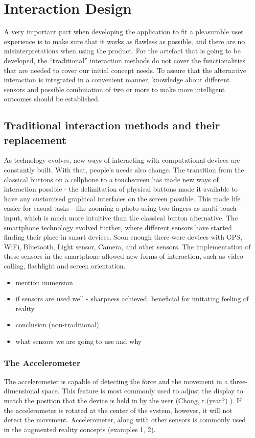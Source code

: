 \section{Interaction Design}
A very important part when developing the application to fit a pleasurable user experience is to make sure that it works as flawless as possible, and there are no misinterpretations when using the product. For the artefact that is going to be developed, the “traditional” interaction methods do not cover the functionalities that are needed to cover our initial concept needs. To assure that the alternative interaction is integrated in a convenient manner, knowledge about different sensors and possible combination of two or more to make more intelligent outcomes should be established.
\subsection{Traditional interaction methods and their replacement}
As technology evolves, new ways of interacting with computational devices are constantly built. With that, people’s needs also change. The transition from the classical buttons on a cellphone to a touchscreen has made new ways of interaction possible - the delimitation of physical buttons made it available to have any customised graphical interfaces on the screen possible. This made life easier for casual tasks - like zooming a photo using two fingers as multi-touch input, which is much more intuitive than the classical button alternative.
The smartphone technology evolved further, where different sensors have started finding their place in smart devices. Soon enough there were devices with GPS, WiFi, Bluetooth, Light sensor, Camera, and other sensors. The implementation of these sensors in the smartphone allowed new forms of interaction, such as video calling, flashlight and screen orientation.
\begin{itemize}
\item mention immersion
\item if sensors are used well - sharpness achieved. beneficial for imitating feeling of reality
\item conclusion (non-traditional)
\item what sensors we are going to use and why
\end{itemize}
\subsubsection*{The Accelerometer}
The accelerometer is capable of detecting the force and the movement in a three-dimensional space. This feature is most commonly used to adjust the display to match the position that the device is held in by the user (Chong, r.(year?) ). If the accelerometer is rotated at the center of the system, however, it will not detect the movement. Accelerometer, along with other sensors is commonly used in the augmented reality concepts (examples 1, 2).
